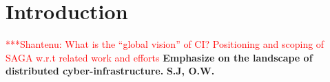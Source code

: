 \documentclass[a4paper,10pt]{article}
\newcommand{\jhanote}[1]{  {\textcolor{red}     { ***Shantenu: #1 }}}
\newcommand{\jhanote}[1]{}
\begin{document}
\section{Introduction}



\jhanote{What is the ``global vision'' of CI? Positioning and scoping
  of SAGA w.r.t related work and efforts}
\textbf{Emphasize on the landscape of distributed
  cyber-infrastructure.} \textbf{S.J, O.W.}


 
\end{document}
